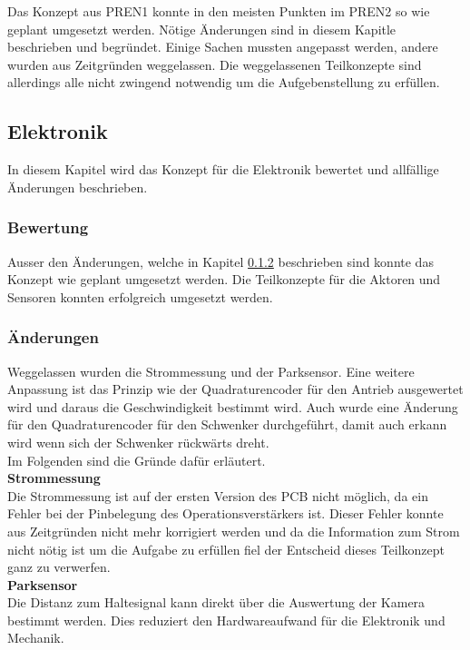\documentclass[../../main.tex]{subfiles}
\begin{document}
Das Konzept aus PREN1 konnte in den meisten Punkten im PREN2 so wie geplant umgesetzt werden. Nötige Änderungen sind in diesem Kapitle beschrieben und begründet. Einige Sachen mussten angepasst werden, andere wurden aus Zeitgründen weggelassen. Die weggelassenen Teilkonzepte sind allerdings alle nicht zwingend notwendig um die Aufgebenstellung zu erfüllen.\\

\subsection{Elektronik}
In diesem Kapitel wird das Konzept für die Elektronik bewertet und allfällige Änderungen beschrieben.

\subsubsection{Bewertung}
Ausser den Änderungen, welche in Kapitel \ref{bewertung_et_aenderungen} beschrieben sind konnte das Konzept wie geplant umgesetzt werden. Die Teilkonzepte für die Aktoren und Sensoren konnten erfolgreich umgesetzt werden.

\subsubsection{Änderungen} \label{bewertung_et_aenderungen}
Weggelassen wurden die Strommessung und der Parksensor. Eine weitere Anpassung ist das Prinzip wie der Quadraturencoder für den Antrieb ausgewertet wird und daraus die Geschwindigkeit bestimmt wird. Auch wurde eine Änderung für den Quadraturencoder für den Schwenker durchgeführt, damit auch erkann wird wenn sich der Schwenker rückwärts dreht.\\
Im Folgenden sind die Gründe dafür erläutert.\\

\textbf{Strommessung}\\
Die Strommessung ist auf der ersten Version des PCB nicht möglich, da ein Fehler bei der Pinbelegung des Operationsverstärkers ist. Dieser Fehler konnte aus Zeitgründen nicht mehr korrigiert werden und da die Information zum Strom nicht nötig ist um die Aufgabe zu erfüllen fiel der Entscheid dieses Teilkonzept ganz zu verwerfen.\\

\textbf{Parksensor}\\
Die Distanz zum Haltesignal kann direkt über die Auswertung der Kamera bestimmt werden. Dies reduziert den Hardwareaufwand für die Elektronik und Mechanik.\\
\end{document}
